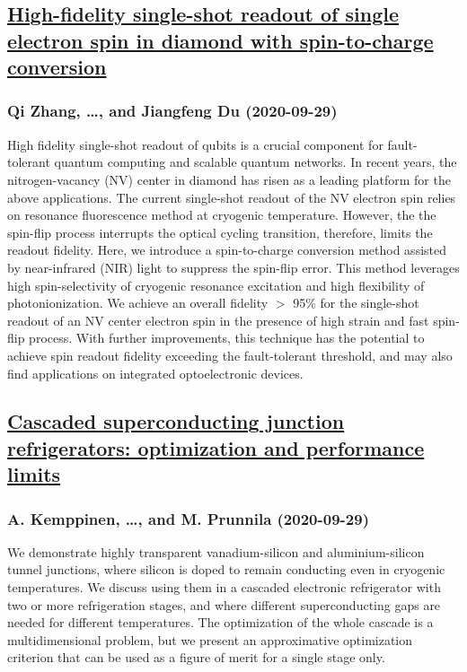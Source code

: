 \subsection*{\href{http://arxiv.org/abs/2009.14172v1}{High-fidelity single-shot readout of single electron spin in diamond  with spin-to-charge conversion}}
\subsubsection*{Qi Zhang, \dots, and Jiangfeng Du (2020-09-29)}
High fidelity single-shot readout of qubits is a crucial component for
fault-tolerant quantum computing and scalable quantum networks. In recent
years, the nitrogen-vacancy (NV) center in diamond has risen as a leading
platform for the above applications. The current single-shot readout of the NV
electron spin relies on resonance fluorescence method at cryogenic temperature.
However, the the spin-flip process interrupts the optical cycling transition,
therefore, limits the readout fidelity. Here, we introduce a spin-to-charge
conversion method assisted by near-infrared (NIR) light to suppress the
spin-flip error. This method leverages high spin-selectivity of cryogenic
resonance excitation and high flexibility of photonionization. We achieve an
overall fidelity $>$ 95\% for the single-shot readout of an NV center electron
spin in the presence of high strain and fast spin-flip process. With further
improvements, this technique has the potential to achieve spin readout fidelity
exceeding the fault-tolerant threshold, and may also find applications on
integrated optoelectronic devices.

\subsection*{\href{http://arxiv.org/abs/2009.14166v1}{Cascaded superconducting junction refrigerators: optimization and  performance limits}}
\subsubsection*{A. Kemppinen, \dots, and M. Prunnila (2020-09-29)}
We demonstrate highly transparent vanadium-silicon and aluminium-silicon
tunnel junctions, where silicon is doped to remain conducting even in cryogenic
temperatures. We discuss using them in a cascaded electronic refrigerator with
two or more refrigeration stages, and where different superconducting gaps are
needed for different temperatures. The optimization of the whole cascade is a
multidimensional problem, but we present an approximative optimization
criterion that can be used as a figure of merit for a single stage only.

